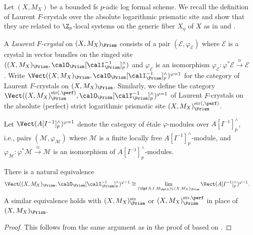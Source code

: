Let $(X,M_X)$ be a bounded fs $p$-adic log formal scheme. We recall the definition of Laurent $F$-crystals over the absolute logarithmic prismatic site and show that they are related to $\Z_p$-local systems on the generic fiber $X_\eta$ of $X$ as in \cite[\S3]{bhatt-scholze-prismaticFcrystal} and \cite[\S7.5]{koshikawa-yao}.

\begin{defn} \label{def:Laurent-F-crystals}
A \emph{Laurent $F$-crystal} on $(X,M_X)_\Prism$  consists of a pair $(\mathscr{E},\varphi_{\mathscr{E}})$ where $\mathscr{E}$ is a crystal in vector bundles on the ringed site $((X,M_X)_\Prism, \calO_\Prism[\calI_\Prism^{-1}]^\wedge_p)$ and $\varphi_{\mathscr{E}}$ is an isomorphism $\varphi_{\mathscr{E}}\colon \varphi^\ast {\mathscr{E}}\xrightarrow{\cong}{\mathscr{E}}$.
Write $\Vect((X,M_X)_\Prism,\calO_\Prism[\calI_\Prism^{-1}]^\wedge_p)^{\varphi=1}$ for the category of Laurent $F$-crystals on $(X,M_X)_\Prism$.
Similarly, we define the category $\Vect((X,M_X)_\Prism^{\mathrm{str}(, \perf)},\calO_\Prism[\calI_\Prism^{-1}]^\wedge_p)^{\varphi=1}$ of Laurent $F$-crystals on the absolute (perfect) strict logarithmic prismatic site $(X,M_X)_\Prism^{\mathrm{str}(, \perf)}$.
\end{defn}


Let $\Vect(A[I^{-1}]^\wedge_p)^{\varphi=1}$ denote the category of \'etale $\varphi$-modules over $A[I^{-1}]^\wedge_p$, i.e., pairs $(\mathcal{M},\varphi_{\mathcal{M}})$ where $\mathcal{M}$ is a finite locally free $A[I^{-1}]^\wedge_p$-module, and $\varphi_{\mathcal{M}}\colon \varphi^\ast \mathcal{M} \xrightarrow{\cong} \mathcal{M}$ is an isomorphism of $A[I^{-1}]^\wedge_p$-modules.

\begin{lem} \label{lem:Laurent log F-crystals as limit}
There is a natural equivalence
\[
\Vect((X,M_X)_\Prism,\calO_\Prism[\calI_\Prism^{-1}]^\wedge_p)^{\varphi=1}\cong
\lim_{(\Spf A,I,M_{\Spf A})\in (X,M_X)_\Prism}\Vect(A[I^{-1}]^\wedge_p)^{\varphi=1}.
\]
A similar equivalence holds with $(X,M_X)_\Prism^\mathrm{str}$ or $(X,M_X)_\Prism^{\mathrm{str},\perf}$ in place of $(X,M_X)_\Prism$.
\end{lem}

\begin{proof}
This follows from the same argument as in the proof of \cite[Prop.~2.7]{bhatt-scholze-prismaticFcrystal} based on \cite[Thm.~5.8]{mathew-descent}.
\end{proof}



